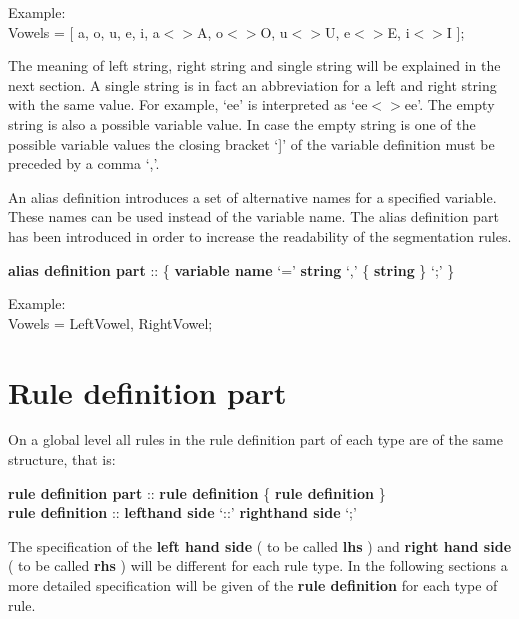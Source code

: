 \small
\begin{code}
Example: \\
\>\>Vowels = [ a, o, u, e, i, a$<>$A, o$<>$O, u$<>$U, e$<>$E, i$<>$I ]; \\
\end{code}
\normalsize

The meaning of left string, right string and single string will be explained in
the next section. A single string is in fact an abbreviation for
a left and right string with the same value. For example, `ee' is
interpreted as `ee$<>$ee'. The empty string is also a possible variable value.
In case the empty string is one of the possible variable values the closing
bracket `]' of the variable definition must be preceded by a comma `,'.

An alias definition introduces a set of alternative
names for a specified variable.
These names can be used instead of the variable name. The alias definition
part has been introduced in order to increase the readability of the
segmentation rules.

\small
\begin{code}
{\bf alias definition part} :: \{ {\bf variable name} `=' {\bf string} `,' \{ {\bf string} \} `;' \}\\
\end{code}
\normalsize

\small
\begin{code}
Example: \\
\>\>Vowels = LeftVowel, RightVowel;
\end{code}
\normalsize


\section{Rule definition part}

On a global level all rules in the rule definition part of each type are of
the same structure, that is:\\
\small
\begin{code}
{\bf rule definition part } :: {\bf rule definition} \{ {\bf rule definition} \} \\
{\bf rule definition } :: {\bf lefthand side} `::' {\bf righthand side} `;'\\
\end{code}
\normalsize

The specification of the {\bf left hand side} ( to be called {\bf lhs} ) and
{\bf right hand side } ( to be called {\bf rhs} ) will be different for each rule
type. In the following sections a more detailed specification will be given of
the {\bf rule definition } for each type of rule.

